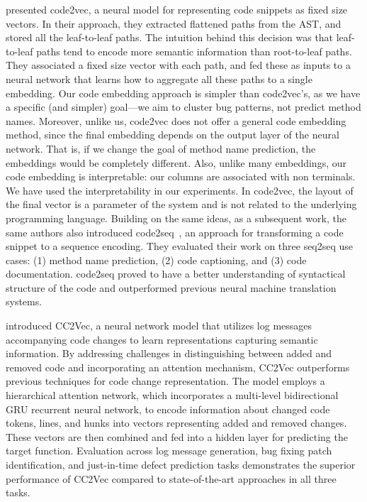 \cite{alon2019code2vec} presented code2vec, a neural model for representing code snippets as fixed size vectors. In their approach, they extracted flattened paths from the AST, and stored all the leaf-to-leaf paths. The intuition behind this decision was that leaf-to-leaf paths tend to encode more semantic information than root-to-leaf paths. They associated a fixed size vector with each path, and fed these as inputs to a neural network that learns how to aggregate all these paths to a single embedding. Our code embedding approach is simpler than code2vec's, as we have a specific (and simpler) goal---we aim to cluster bug patterns, not predict method names. Moreover, unlike us, code2vec does not offer a general code embedding method, since the final embedding depends on the output layer of the neural network. That is, if we change the goal of method name prediction, the embeddings would be completely different. Also, unlike many embeddings, our code embedding is interpretable: our columns are associated with non terminals. We have used the interpretability in our experiments. In code2vec, the layout of the final vector is a parameter of the system and  is not related to the underlying programming language. Building on the same ideas, as a subsequent work, the same authors also introduced code2seq~\citep{alon2019code2seq}, an approach for transforming a code snippet to a sequence encoding. They evaluated their work on three seq2seq use cases: (1) method name prediction, (2) code captioning, and (3) code documentation. code2seq proved to have a better understanding of syntactical structure of the code and outperformed previous neural machine translation systems.

\cite{hoang2020cc2vec} introduced CC2Vec, a neural network model that utilizes log messages accompanying code changes to learn representations capturing semantic information. By addressing challenges in distinguishing between added and removed code and incorporating an attention mechanism, CC2Vec outperforms previous techniques for code change representation. The model employs a hierarchical attention network, which incorporates a multi-level bidirectional GRU recurrent neural network, to encode information about changed code tokens, lines, and hunks into vectors representing added and removed changes. These vectors are then combined and fed into a hidden layer for predicting the target function. Evaluation across log message generation, bug fixing patch identification, and just-in-time defect prediction tasks demonstrates the superior performance of CC2Vec compared to state-of-the-art approaches in all three tasks.

